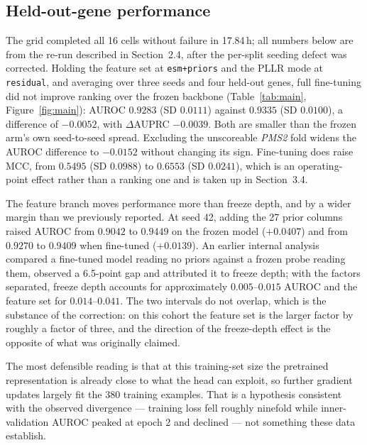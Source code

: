 \documentclass{bioinfo}
\newcommand{\gene}[1]{\textit{#1}}
\begin{document}
\subsection{Held-out-gene performance}

The grid completed all 16 cells without failure in 17.84\,h; all numbers below
are from the re-run described in Section~2.4, after the per-split seeding defect
was corrected. Holding the feature set at \texttt{esm+priors} and the PLLR mode
at \texttt{residual}, and averaging over three seeds and four held-out genes,
full fine-tuning did not improve ranking over the frozen backbone
(Table~\ref{tab:main}, Figure~\ref{fig:main}): AUROC $0.9283$ (SD $0.0111$) against $0.9335$
(SD $0.0100$), a difference of $-0.0052$, with $\Delta$AUPRC $-0.0039$. Both are
smaller than the frozen arm's own seed-to-seed spread. Excluding the unscoreable
\gene{PMS2} fold widens the AUROC difference to $-0.0152$ without changing its
sign. Fine-tuning does raise MCC, from $0.5495$ (SD $0.0988$) to $0.6553$
(SD $0.0241$), which is an operating-point effect rather than a ranking one and
is taken up in Section~3.4.

The feature branch moves performance more than freeze depth, and by a wider
margin than we previously reported. At seed 42, adding the 27 prior columns
raised AUROC from $0.9042$ to $0.9449$ on the frozen model ($+0.0407$) and from
$0.9270$ to $0.9409$ when fine-tuned ($+0.0139$). An earlier internal analysis
compared a fine-tuned model reading no priors against a frozen probe reading
them, observed a 6.5-point gap and attributed it to freeze depth; with the
factors separated, freeze depth accounts for approximately $0.005$--$0.015$
AUROC and the feature set for $0.014$--$0.041$. The two intervals do not
overlap, which is the substance of the correction: on this cohort the feature
set is the larger factor by roughly a factor of three, and the direction of the
freeze-depth effect is the opposite of what was originally claimed.

The most defensible reading is that at this training-set size the pretrained
representation is already close to what the head can exploit, so further
gradient updates largely fit the 380 training examples. That is a hypothesis
consistent with the observed divergence --- training loss fell roughly ninefold
while inner-validation AUROC peaked at epoch 2 and declined --- not something
these data establish.
\end{document}

